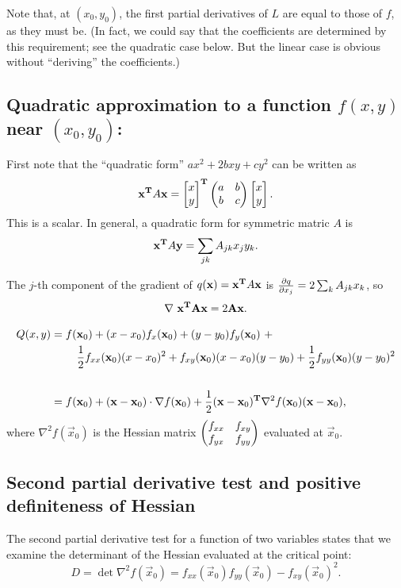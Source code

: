 Note that, at $(x_0, y_0)$, the first partial derivatives of $L$ are equal to
those of $f$, as they must be. (In fact, we could say that the coefficients are
determined by this requirement; see the quadratic case below. But the linear
case is obvious without ``deriving'' the coefficients.)


\subsection{Quadratic approximation to a function $f(x, y)$ near $(x_0, y_0)$:}

First note that the ``quadratic form'' $ax^2 + 2bxy + cy^2$ can be written as
\begin{align*}
\mathbf x^{\mathbf{T}} A \mathbf x = \begin{bmatrix}x\\y\end{bmatrix}^{\mathbf{T}} \begin{pmatrix}a & b\\b & c\\ \end{pmatrix} \begin{bmatrix}x\\y\end{bmatrix}.
\end{align*}
This is a scalar. In general, a quadratic form for symmetric matric $A$ is
\begin{align*}
\mathbf x^{\mathbf{T}} A \mathbf y = \sum_{jk}A_{jk}x_jy_k.
\end{align*}

The $j$-th component of the gradient of $q(\mathbf x) = \mathbf x^{\mathbf{T}} A \mathbf x$ is
$\frac{\partial q}{\partial x_j} = 2\sum_k A_{jk}x_k$, so
\begin{align*}
  \nabla ~\mathbf x^{\mathbf{T}} \mathbf A \mathbf x = 2\mathbf A \mathbf x.
\end{align*}

\begin{align*}
Q(x, y) &=
f(\mathbf x_0) + (x - x_0)f_x(\mathbf x_0) +
(y - y_0)f_y(\mathbf x_0) ~+ \\
&~~~~~~~\frac{1}{2} f_{xx}(\mathbf x_0)(x - x_0)^2 +
f_{xy}(\mathbf x_0)(x - x_0)(y - y_0) +
\frac{1}{2} f_{yy}(\mathbf x_0)(y - y_0)^2 \\\\
&= f(\mathbf x_0) +
(\mathbf x - \mathbf x_0) \cdot \nabla f(\mathbf x_0) +
\frac{1}{2}(\mathbf x - \mathbf x_0)^{\mathbf{T}} \nabla^2 f(\mathbf x_0)(\mathbf x - \mathbf x_0),
\end{align*}
where $\nabla^2 f(\vec x_0)$ is the Hessian matrix $\begin{pmatrix}f_{xx} & f_{xy}\\f_{yx} & f_{yy}\\ \end{pmatrix}$ evaluated at $\vec x_0$.

\subsection{Second partial derivative test and positive definiteness of Hessian}

The second partial derivative test for a function of two variables states that
we examine the determinant of the Hessian evaluated at the critical point:
$$
D = \det \nabla^2 f(\vec x_0) = f_{xx}(\vec x_0)f_{yy}(\vec x_0) - f_{xy}(\vec x_0)^2.
$$

